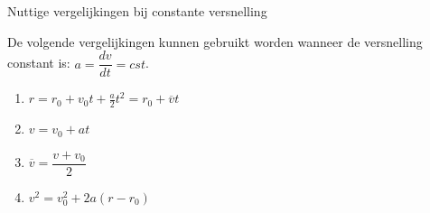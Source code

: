 






\begin{pro}{Nuttige vergelijkingen bij constante versnelling}

    De volgende vergelijkingen kunnen gebruikt worden wanneer de versnelling constant is: $a = \dfrac{dv}{dt} = cst$. 
    
    \begin{enumerate}
        \item $ r = r_{0} + v_{0}t + \tfrac{a}{2}t^2 = r_{0} + \overline{v}t$
        \item $ v = v_0 + at $ 
        \item $ \overline{v} = \dfrac{v + v_0}{2}$
        \item $ v^2 = v_0^2 + 2a(r-r_0) $
    \end{enumerate}
\end{pro}

